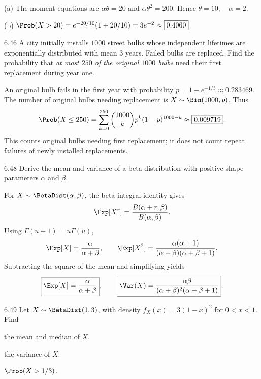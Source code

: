 \documentclass[11pt,oneside]{article}
\begin{document}
\begin{solution}
\noindent\textup{(a)} The moment equations are $\alpha\theta=20$ and $\alpha\theta^2=200$. Hence $\boxed{\theta=10,\quad\alpha=2}$.

\noindent\textup{(b)} $\Prob(X>20)=e^{-20/10}(1+20/10)=3e^{-2}\approx\boxed{0.4060}$.
\end{solution}

\begin{exercise}{6.46}
A city initially installs $1000$ street bulbs whose independent lifetimes are exponentially distributed with mean $3$ years. Failed bulbs are replaced. Find the probability that \emph{at most $250$ of the original $1000$ bulbs} need their first replacement during year one.
\end{exercise}

\begin{solution}
An original bulb fails in the first year with probability $p=1-e^{-1/3}\approx0.283469$. The number of original bulbs needing replacement is $X\sim\Bin(1000,p)$. Thus
\[
\Prob(X\le250)=\sum_{k=0}^{250}\displaystyle\binom{1000}{k}p^k(1-p)^{1000-k}
\approx\boxed{0.009719}.
\]
This counts original bulbs needing first replacement; it does not count repeat failures of newly installed replacements.
\end{solution}

\begin{exercise}{6.48}
Derive the mean and variance of a beta distribution with positive shape parameters $\alpha$ and $\beta$.
\end{exercise}

\begin{solution}
For $X\sim\BetaDist(\alpha,\beta)$, the beta-integral identity gives
\[
\Exp[X^r]=\frac{B(\alpha+r,\beta)}{B(\alpha,\beta)}.
\]
Using $\Gamma(u+1)=u\Gamma(u)$,
\[
\Exp[X]=\frac\alpha{\alpha+\beta},\qquad
\Exp[X^2]=\frac{\alpha(\alpha+1)}{(\alpha+\beta)(\alpha+\beta+1)}.
\]
Subtracting the square of the mean and simplifying yields
\[
\boxed{\Exp[X]=\frac\alpha{\alpha+\beta}},\qquad
\boxed{\Var(X)=\frac{\alpha\beta}{(\alpha+\beta)^2(\alpha+\beta+1)}}.
\]
\end{solution}

\begin{exercise}{6.49}
Let $X\sim\BetaDist(1,3)$, with density $f_X(x)=3(1-x)^2$ for $0<x<1$. Find
\begin{exercisesubparts}
\item the mean and median of $X$.
\item the variance of $X$.
\item $\Prob(X>1/3)$.
\end{exercisesubparts}
\end{exercise}
\end{document}
